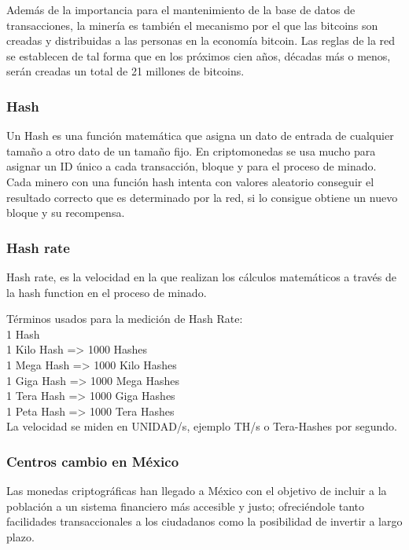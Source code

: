 \documentclass[12pt,letterpaper]{article}
\begin{document}
Adem\'as de la importancia para el mantenimiento de la base de datos de transacciones, la miner\'ia es tambi\'en el mecanismo por el que las bitcoins son creadas y distribuidas a las personas en la econom\'ia bitcoin. Las reglas de la red se establecen de tal forma que en los pr\'oximos cien años, d\'ecadas m\'as o menos, ser\'an creadas un total de 21 
millones de bitcoins. 
\\

\subsubsection*{Hash}
Un Hash es una función matemática que asigna un dato de entrada de cualquier tamaño a otro dato de un tamaño fijo. En criptomonedas se usa mucho para asignar un ID único a cada transacción, bloque y para el proceso de minado. Cada minero con una función hash intenta con valores aleatorio conseguir el resultado correcto que es determinado por la red, si lo consigue obtiene un nuevo bloque y su recompensa.

	

    \subsubsection*{Hash rate}
    Hash rate, es la velocidad en la que realizan los cálculos matemáticos a través de la hash function en el proceso de minado.

Términos usados para la medición de Hash Rate:
\\

    1 Hash \\
    1 Kilo Hash => 1000 Hashes \\
    1 Mega Hash => 1000 Kilo Hashes \\
    1 Giga Hash => 1000 Mega Hashes \\
    1 Tera Hash => 1000 Giga Hashes \\
    1 Peta Hash => 1000 Tera Hashes \\

La velocidad se miden en UNIDAD/s, ejemplo TH/s o Tera-Hashes por segundo.

		\subsubsection*{Centros cambio en M\'exico}
Las monedas criptogr\'aficas han llegado a M\'exico con el objetivo de incluir a la poblaci\'on a un sistema financiero m\'as accesible y justo; ofreci\'endole tanto facilidades transaccionales a los ciudadanos como la posibilidad de invertir a largo plazo.
\\
\end{document}
